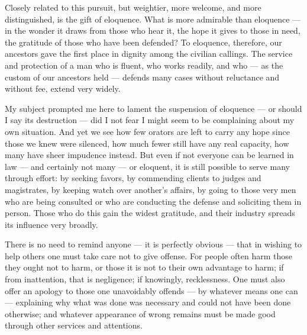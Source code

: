  Closely related to this pursuit, but weightier, more welcome, and more distinguished, is the gift of eloquence. What is more admirable than eloquence — in the wonder it draws from those who hear it, the hope it gives to those in need, the gratitude of those who have been defended? To eloquence, therefore, our ancestors gave the first place in dignity among the civilian callings. The service and protection of a man who is fluent, who works readily, and who — as the custom of our ancestors held — defends many cases without reluctance and without fee, extend very widely.

 My subject prompted me here to lament the suspension of eloquence — or should I say its destruction — did I not fear I might seem to be complaining about my own situation. And yet we see how few orators are left to carry any hope since those we knew were silenced, how much fewer still have any real capacity, how many have sheer impudence instead. But even if not everyone can be learned in law — and certainly not many — or eloquent, it is still possible to serve many through effort: by seeking favors, by commending clients to judges and magistrates, by keeping watch over another's affairs, by going to those very men who are being consulted or who are conducting the defense and soliciting them in person. Those who do this gain the widest gratitude, and their industry spreads its influence very broadly.

 There is no need to remind anyone — it is perfectly obvious — that in wishing to help others one must take care not to give offense. For people often harm those they ought not to harm, or those it is not to their own advantage to harm; if from inattention, that is negligence; if knowingly, recklessness. One must also offer an apology to those one unavoidably offends — by whatever means one can — explaining why what was done was necessary and could not have been done otherwise; and whatever appearance of wrong remains must be made good through other services and attentions.

